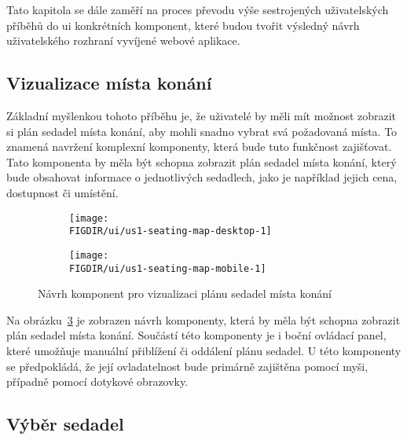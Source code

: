 Tato kapitola se dále zaměří na proces převodu výše sestrojených uživatelských příběhů do \ac{ui} konkrétních komponent, které budou tvořit výsledný návrh uživatelského rozhraní vyvíjené webové aplikace.

\subsection{Vizualizace místa konání}
\label{subsec:narvh-ui-transformace-uzivatelskych-pribehu-vizualizace-mista-konani}
\userstoryvenuemap

Základní myšlenkou tohoto příběhu je, že uživatelé by měli mít možnost zobrazit si plán sedadel místa konání, aby mohli snadno vybrat svá požadovaná místa.
To znamená navržení komplexní komponenty, která bude tuto funkčnost zajišťovat.
Tato komponenta by měla být schopna zobrazit plán sedadel místa konání, který bude obsahovat informace o jednotlivých sedadlech, jako je například jejich cena, dostupnost či umístění.

\begin{figure}[H]
    \centering
    \begin{subfigure}{0.775\textwidth}
        \texttt{[image: \\FIGDIR/ui/us1-seating-map-desktop-1]}
        \label{fig:us1-seating-map-desktop-1}
    \end{subfigure}
    \begin{subfigure}{0.2\textwidth}
        \texttt{[image: \\FIGDIR/ui/us1-seating-map-mobile-1]}
        \label{fig:us1-seating-map-mobile-1}
    \end{subfigure}
    \caption{Návrh komponent pro vizualizaci plánu sedadel místa konání}
    \label{fig:us1-seating-map}
\end{figure}

Na obrázku~\ref{fig:us1-seating-map} je zobrazen návrh komponenty, která by měla být schopna zobrazit plán sedadel místa konání.
Součástí této komponenty je i boční ovládací panel, které umožňuje manuální přiblížení či oddálení plánu sedadel.
U této komponenty se předpokládá, že její ovladatelnost bude primárně zajištěna pomocí myši, případně pomocí dotykové obrazovky.

\subsection{Výběr sedadel}
\label{subsec:narvh-ui-transformace-uzivatelskych-pribehu-vyber-sedadel}
\userstoryseatselection

